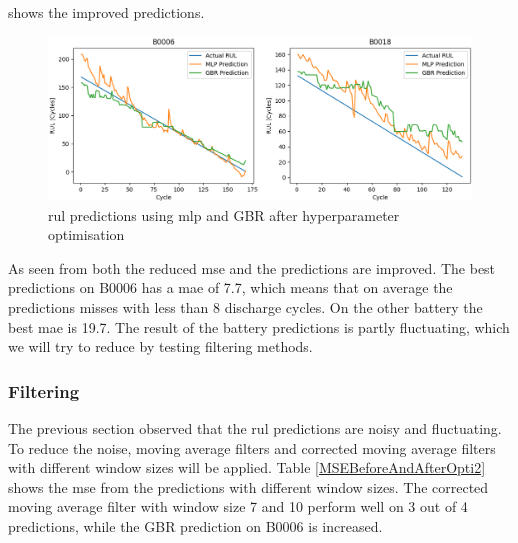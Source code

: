 \documentclass[english, a4paper]{report}
\begin{document}
{{{{                 shows the improved predictions.
                
                \begin{figure}[H]
                    \centering \includegraphics[width=1\textwidth]{ImprovedPredictions2}
                    \caption{\gls{rul} predictions using \gls{mlp} and GBR after hyperparameter optimisation}
                    \label{fig:ImprovedPredictions2}
                \end{figure}
                
                As seen from both the reduced \gls{mse} and  the predictions are improved. The best predictions on B0006 has a \gls{mae} of 7.7, which means that on average the predictions misses with less than 8 discharge cycles. On the other battery the best \gls{mae} is 19.7.
                The result of the battery predictions is partly fluctuating, which we will try to reduce by testing filtering methods.
            }
            
            \subsubsection{Filtering}
            {
                The previous section observed that the \gls{rul} predictions are noisy and fluctuating. To reduce the noise, moving average filters and corrected moving average filters with different window sizes will be applied. Table \ref{MSEBeforeAndAfterOpti2} shows the \gls{mse} from the predictions with different window sizes. The corrected moving average filter with window size 7 and 10 perform well on 3 out of 4 predictions, while the GBR prediction on B0006 is increased. 
                
}}}}
\end{document}
